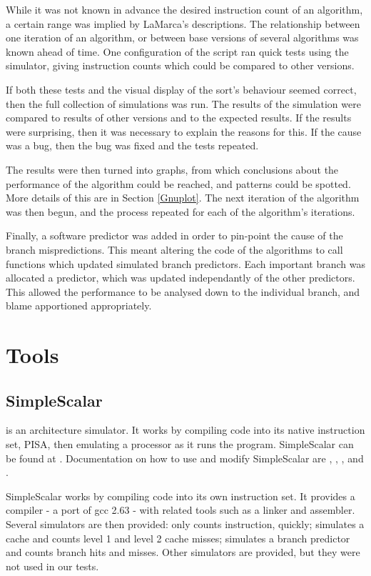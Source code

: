 While it was not known in advance the desired instruction count of an algorithm,
a certain range was implied by LaMarca's descriptions. The relationship between
one iteration of an algorithm, or between base versions of several algorithms
was known ahead of time. One configuration of the  script ran quick
tests using the  simulator, giving instruction counts which could
be compared to other versions. 

If both these tests and the visual display of the sort's behaviour seemed
correct, then the full collection of simulations was run. The results of the
simulation were compared to results of other versions and to the expected
results. If the results were surprising, then it was necessary to explain the
reasons for this. If the cause was a bug, then the bug was fixed and the tests
repeated.

The results were then turned into graphs, from which conclusions about the
performance of the algorithm could be reached, and patterns could be spotted.
More details of this are in Section \ref{Gnuplot}. The next iteration of the
algorithm was then begun, and the process repeated for each of the algorithm's
iterations.

Finally, a software predictor was added in order to pin-point the cause of the
branch mispredictions. This meant altering the code of the algorithms to call
functions which updated simulated branch predictors. Each important branch was
allocated a predictor, which was updated independantly of the other predictors.
This allowed the performance to be analysed down to the individual branch, and
blame apportioned appropriately.

\section{Tools}

\subsection{SimpleScalar}  is an architecture simulator. It
works by compiling code into its native instruction set, PISA, then emulating a
processor as it runs the program.  SimpleScalar can be found at
. Documentation on how to use and modify
SimpleScalar are \cite{Burger97}, \cite{Austin02}, \cite{Tutorialv4},
\cite{Tutorialv2} and \cite{SimpleScalarUserGuide}.

SimpleScalar works by compiling code into its own instruction set. It provides a
compiler - a port of gcc 2.63 - with related tools such as a linker and
assembler.  Several simulators are then provided:  only counts
instruction, quickly;  simulates a cache and counts level 1 and
level 2 cache misses;  simulates a branch predictor and counts
branch hits and misses. Other simulators are provided, but they were not used in
our tests.


